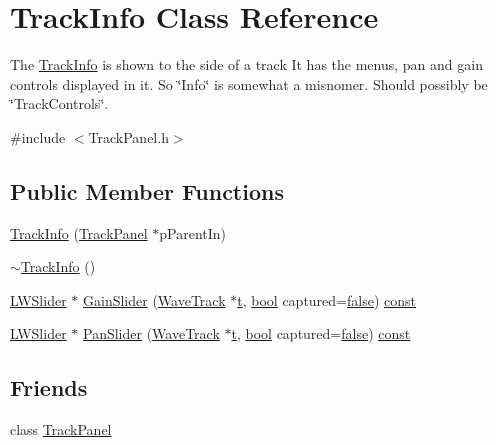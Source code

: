 \hypertarget{class_track_info}{}\section{Track\+Info Class Reference}
\label{class_track_info}


The \hyperlink{class_track_info}{Track\+Info} is shown to the side of a track It has the menus, pan and gain controls displayed in it. So \char`\"{}\+Info\char`\"{} is somewhat a misnomer. Should possibly be \char`\"{}\+Track\+Controls\char`\"{}.  




{\ttfamily \#include $<$Track\+Panel.\+h$>$}

\subsection*{Public Member Functions}
\begin{DoxyCompactItemize}
\item 
\hyperlink{class_track_info_ab1d79cb1e92250107d849b0d26cf3884}{Track\+Info} (\hyperlink{class_track_panel}{Track\+Panel} $\ast$p\+Parent\+In)
\item 
\hyperlink{class_track_info_a75845daa131074e194dfe94a90f2cd78}{$\sim$\+Track\+Info} ()
\item 
\hyperlink{class_l_w_slider}{L\+W\+Slider} $\ast$ \hyperlink{class_track_info_a190efcbb5578f98b16b20b193209cf43}{Gain\+Slider} (\hyperlink{class_wave_track}{Wave\+Track} $\ast$\hyperlink{octave__test_8m_aaccc9105df5383111407fd5b41255e23}{t}, \hyperlink{mac_2config_2i386_2lib-src_2libsoxr_2soxr-config_8h_abb452686968e48b67397da5f97445f5b}{bool} captured=\hyperlink{mac_2config_2i386_2lib-src_2libsoxr_2soxr-config_8h_a65e9886d74aaee76545e83dd09011727}{false}) \hyperlink{getopt1_8c_a2c212835823e3c54a8ab6d95c652660e}{const} 
\item 
\hyperlink{class_l_w_slider}{L\+W\+Slider} $\ast$ \hyperlink{class_track_info_ac92f8d630b86e38deade6c1b55d166dc}{Pan\+Slider} (\hyperlink{class_wave_track}{Wave\+Track} $\ast$\hyperlink{octave__test_8m_aaccc9105df5383111407fd5b41255e23}{t}, \hyperlink{mac_2config_2i386_2lib-src_2libsoxr_2soxr-config_8h_abb452686968e48b67397da5f97445f5b}{bool} captured=\hyperlink{mac_2config_2i386_2lib-src_2libsoxr_2soxr-config_8h_a65e9886d74aaee76545e83dd09011727}{false}) \hyperlink{getopt1_8c_a2c212835823e3c54a8ab6d95c652660e}{const} 
\end{DoxyCompactItemize}
\subsection*{Friends}
\begin{DoxyCompactItemize}
\item 
class \hyperlink{class_track_info_aaf0a26868e2a6f67a8c005e01e77d052}{Track\+Panel}
\end{DoxyCompactItemize}


